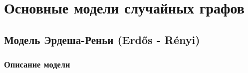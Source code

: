 \documentclass[t]{beamer}
\begin{document}
    
    \frame{\titlepage}
    
    \section{Основные модели случайных графов}
    \subsection{Модель Эрдеша-Реньи (Erdős - Rényi)}  
    \subsubsection{Описание модели}	
    
        
    \begin{frame}
       
    \end{frame}	
    
    \begin{frame}
        
    \end{frame}	

    \begin{frame}
        
    \end{frame}	
    
    \begin{frame}
        
    \end{frame}	
    
\end{document}
